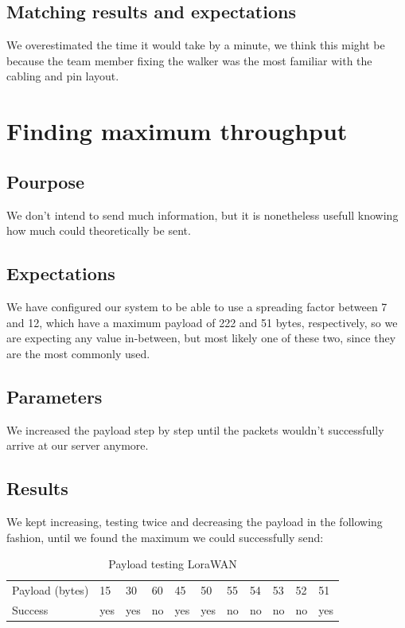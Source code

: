 	\subsection{Matching results and expectations}
		We overestimated the time it would take by a minute, we think this might be because the team member fixing the walker was the most familiar with the cabling and pin layout.

\section{Finding maximum throughput}

	\subsection{Pourpose}
		We don't intend to send much information, but it is nonetheless usefull knowing how much could theoretically be sent.
	\subsection{Expectations}
		We have configured our system to be able to use a spreading factor between 7 and 12, which have a maximum payload of 222 and 51 bytes, respectively, so we are expecting any value in-between, but most likely one of these two, since they are the most commonly used.
	\subsection{Parameters}
		We increased the payload step by step until the packets wouldn't successfully arrive at our server anymore.
	\subsection{Results}
		We kept increasing, testing twice and decreasing the payload in the following fashion, until we found the maximum we could successfully send:

		\begin{table}[h]
			\begin{tabular}{@{}lllllllllll@{}}
				Payload (bytes) & 15  & 30  & 60 & 45  & 50  & 55 & 54 & 53 & 52 & 51  \\
				Success & yes & yes & no & yes & yes & no & no & no & no & yes
			\end{tabular}
			\caption[Payload testing LoraWAN]{Payload testing LoraWAN}
			\label{tab:LoraWanPayload}
		\end{table}

